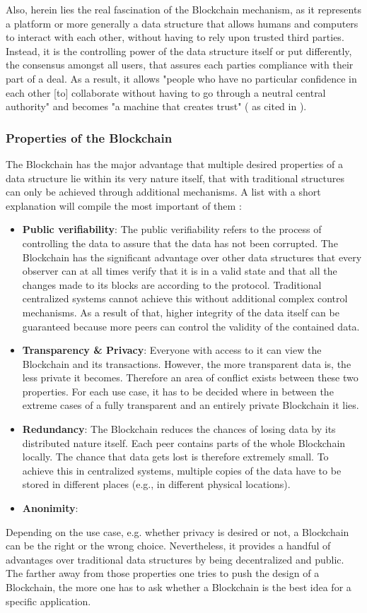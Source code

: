 Also, herein lies the real fascination of the Blockchain mechanism, as it represents a platform or more generally a data structure that allows humans and computers to interact with each other, without having to rely upon trusted third parties. Instead, it is the controlling power of the data structure itself or put differently, the consensus amongst all users, that assures each parties compliance with their part of a deal. As a result, it allows "people who have no particular confidence in each other [to] collaborate without having to go through a neutral central authority" and becomes "a machine that creates trust" (\cite{Economist2015} as cited in \cite{Shackelford2016}).
\subsubsection{Properties of the Blockchain}
The Blockchain has the major advantage that multiple desired properties of a data structure lie within its very nature itself, that with traditional structures can only be achieved through additional mechanisms. A list with a short explanation will compile the most important of them \cite{Wust2017}:
\begin{itemize}
  \item \textbf{Public verifiability}: The public verifiability refers to the process of controlling the data to assure that the data has not been corrupted. The Blockchain has the significant advantage over other data structures that every observer can at all times verify that it is in a valid state and that all the changes made to its blocks are according to the protocol. Traditional centralized systems cannot achieve this without additional complex control mechanisms.
        As a result of that, higher integrity of the data itself can be guaranteed because more peers can control the validity of the contained data.
  \item \textbf{Transparency \& Privacy}: Everyone with access to it can view the Blockchain and its transactions. However, the more transparent data is, the less private it becomes. Therefore an area of conflict exists between these two properties. For each use case, it has to be decided where in between the extreme cases of a fully transparent and an entirely private Blockchain it lies.

  \item \textbf{Redundancy}: The Blockchain reduces the chances of losing data by its distributed nature itself. Each peer contains parts of the whole Blockchain locally. The chance that data gets lost is therefore extremely small. To achieve this in centralized systems, multiple copies of the data have to be stored in different places (e.g., in different physical locations).
  \item \textbf{Anonimity}:
\end{itemize}
Depending on the use case, e.g. whether privacy is desired or not, a Blockchain can be the right or the wrong choice. Nevertheless, it provides a handful of advantages over traditional data structures by being decentralized and public. The farther away from those properties one tries to push the design of a Blockchain, the more one has to ask whether a Blockchain is the best idea for a specific application.

